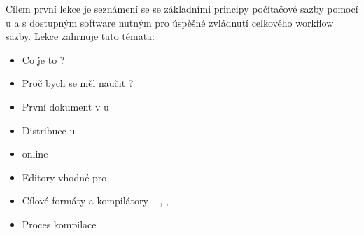 {
	Cílem první lekce je seznámení se se základními principy počítačové sazby pomocí u a s dostupným software nutným pro úspěšné zvládnutí celkového workflow sazby. Lekce zahrnuje tato témata:
	\begin{itemize}
		\item Co je to ?
		\item Proč bych se měl naučit ?
		\item První dokument v u
		\item Distribuce u
		\item {} online
		\item Editory vhodné pro 
		\item Cílové formáty a kompilátory -- , , 
		\item Proces kompilace
	\end{itemize}
}
\endinput
